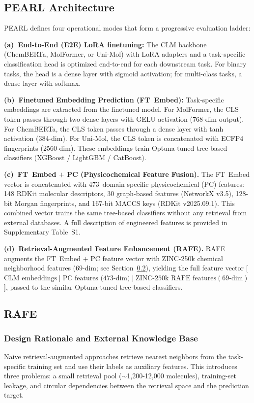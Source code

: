\documentclass[pdflatex,sn-mathphys-num]{sn-jnl}%
\theoremstyle{thmstyleone}%
\theoremstyle{thmstyletwo}%
\theoremstyle{thmstylethree}%
\begin{document}
\subsection{PEARL Architecture} \label{PEARL}
PEARL defines four operational modes that form a progressive evaluation ladder:

\textbf{(a)~End-to-End (E2E) LoRA finetuning:}
The CLM backbone (ChemBERTa, MolFormer, or Uni-Mol) with LoRA adapters and a task-specific classification head is optimized end-to-end for each downstream task. For binary tasks, the head is a dense layer with sigmoid activation;
for multi-class tasks, a dense layer with softmax.

\textbf{(b)~Finetuned Embedding Prediction (FT~Embed):}
Task-specific embeddings are extracted from the finetuned model. For MolFormer, the CLS token passes through two dense layers with GELU activation (768-dim output). For ChemBERTa, the CLS token passes through a dense layer with tanh activation (384-dim). For Uni-Mol, the CLS token is concatenated with ECFP4 fingerprints (2560-dim).
These embeddings train Optuna-tuned \cite{akiba2019optuna} tree-based classifiers (XGBoost / LightGBM / CatBoost).

\textbf{(c)~FT~Embed $+$ PC (Physicochemical Feature Fusion).}
The FT~Embed vector is concatenated with 473~domain-specific physicochemical (PC) features: 148 RDKit molecular descriptors, 30 graph-based features (NetworkX v3.5), 128-bit Morgan fingerprints, and 167-bit MACCS keys (RDKit v2025.09.1). This combined vector trains the same tree-based classifiers without any retrieval from external databases. A full description of engineered features is provided in Supplementary Table~S1.

\textbf{(d)~Retrieval-Augmented Feature Enhancement (RAFE).}
RAFE augments the FT~Embed $+$ PC feature vector with ZINC-250k chemical neighborhood features (69-dim; see Section~\ref{sec:rafe}), yielding the full feature vector [$\text{CLM embeddings} \mid \text{PC features (473-dim)} \mid \text{ZINC-250k RAFE features} (69\text{-dim})$], passed to the similar Optuna-tuned tree-based classifiers.

\subsection{RAFE} \label{sec:rafe}
\subsubsection{Design Rationale and External Knowledge Base} \label{sec:zinc_rationale}
Naive retrieval-augmented approaches retrieve nearest neighbors from the task-specific training set and use their labels as auxiliary features. This introduces three problems: a small retrieval pool ($\sim$1,200-12,000 molecules), training-set leakage, and circular dependencies between the retrieval space and the prediction target.
\end{document}
